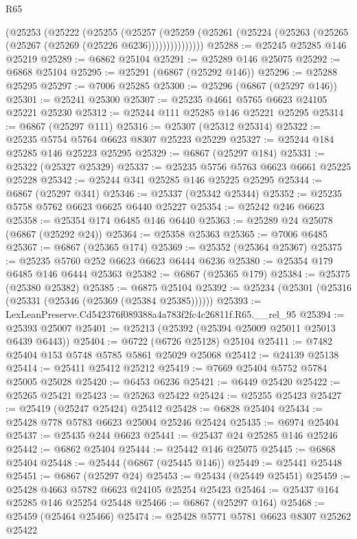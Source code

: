 \begin{lexlean}{R65}
\begin{coremodule}
{          (@25253
            (@25222
              (@25255
                (@25257
                  (@25259
                    (@25261 (@25224 (@25263 (@25265 (@25267 (@25269 (@25226 @6236)))))))))))))))
@25288 := @25245 @25285 @146 @25219
@25289 := @6862 @25104
@25291 := @25289 @146 @25075
@25292 := @6868 @25104
@25295 := @25291 (@6867 (@25292 @146))
@25296 := @25288 @25295
@25297 := @7006 @25285
@25300 := @25296 (@6867 (@25297 @146))
@25301 := @25241 @25300
@25307 := @25235 @4661 @5765 @6623 @24105 @25221 @25230
@25312 := @25244 @111 @25285 @146 @25221 @25295
@25314 := @6867 (@25297 @111)
@25316 := @25307 (@25312 @25314)
@25322 := @25235 @5754 @5764 @6623 @8307 @25223 @25229
@25327 := @25244 @184 @25285 @146 @25223 @25295
@25329 := @6867 (@25297 @184)
@25331 := @25322 (@25327 @25329)
@25337 := @25235 @5756 @5763 @6623 @6661 @25225 @25228
@25342 := @25244 @341 @25285 @146 @25225 @25295
@25344 := @6867 (@25297 @341)
@25346 := @25337 (@25342 @25344)
@25352 := @25235 @5758 @5762 @6623 @6625 @6440 @25227
@25354 := @25242 @246 @6623
@25358 := @25354 @174 @6485 @146 @6440
@25363 := @25289 @24 @25078 (@6867 (@25292 @24))
@25364 := @25358 @25363
@25365 := @7006 @6485
@25367 := @6867 (@25365 @174)
@25369 := @25352 (@25364 @25367)
@25375 := @25235 @5760 @252 @6623 @6623 @6444 @6236
@25380 := @25354 @179 @6485 @146 @6444 @25363
@25382 := @6867 (@25365 @179)
@25384 := @25375 (@25380 @25382)
@25385 := @6875 @25104
@25392 := @25234 (@25301 (@25316 (@25331 (@25346 (@25369 (@25384 @25385))))))
@25393 := LexLeanPreserve.Cd542376f089388a4a783f2fc4c26811f.R65.__rel_95
@25394 := @25393 @25007
@25401 := @25213 (@25392 (@25394 @25009 @25011 @25013 @6439 @6443))
@25404 := @6722 (@6726 @25128) @25104
@25411 := @7482 @25404 @153 @5748 @5785 @5861 @25029 @25068
@25412 := @24139 @25138
@25414 := @25411 @25412 @25212
@25419 := @7669 @25404 @5752 @5784 @25005 @25028
@25420 := @6453 @6236
@25421 := @6449 @25420
@25422 := @25265 @25421
@25423 := @25263 @25422
@25424 := @25255 @25423
@25427 := @25419 (@25247 @25424) @25412
@25428 := @6828 @25404
@25434 := @25428 @778 @5783 @6623 @25004 @25246 @25424
@25435 := @6974 @25404
@25437 := @25435 @244 @6623
@25441 := @25437 @24 @25285 @146 @25246
@25442 := @6862 @25404
@25444 := @25442 @146 @25075
@25445 := @6868 @25404
@25448 := @25444 (@6867 (@25445 @146))
@25449 := @25441 @25448
@25451 := @6867 (@25297 @24)
@25453 := @25434 (@25449 @25451)
@25459 := @25428 @4663 @5782 @6623 @24105 @25254 @25423
@25464 := @25437 @164 @25285 @146 @25254 @25448
@25466 := @6867 (@25297 @164)
@25468 := @25459 (@25464 @25466)
@25474 := @25428 @5771 @5781 @6623 @8307 @25262 @25422
}
\end{coremodule}
\end{lexlean}
